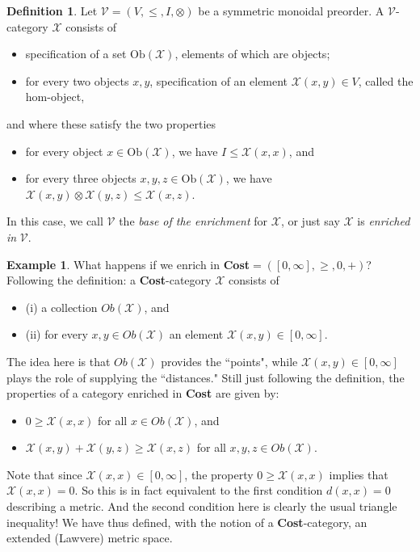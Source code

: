 \documentclass[11pt]{book}
\theoremstyle{definition}
\newtheorem{example}{Example}[section]
\theoremstyle{definition}
\newtheorem{definition}{Definition}[section]
\theoremstyle{definition}
\theoremstyle{theorem}
\theoremstyle{definition}
\begin{document}
\begin{definition}
	Let $\mathcal{V} = (V, \leq, I, \otimes)$ be a symmetric monoidal preorder. A $\mathcal{V}$-category  $\mathcal{X}$ consists of
	\begin{itemize}
		\item specification of a set $\text{Ob}(\mathcal{X})$, elements of which are objects; 
		\item for every two objects $x, y$, specification of an element $\mathcal{X}(x,y) \in V$, called the hom-object, 
	\end{itemize}
	and where these satisfy the two properties 
	\begin{itemize}
		\item for every object $x \in \text{Ob}(\mathcal{X})$, we have $I \leq \mathcal{X}(x,x)$, and 
		\item for every three objects $x, y,z \in \text{Ob}(\mathcal{X})$, we have $\mathcal{X}(x,y) \otimes \mathcal{X}(y,z) \leq \mathcal{X}(x,z)$. 
	\end{itemize}
	In this case, we call $\mathcal{V}$ the \textit{base of the enrichment} for $\mathcal{X}$, or just say $\mathcal{X}$ is \textit{enriched in} $\mathcal{V}$. 
\end{definition}
\begin{example} 
	What happens if we enrich in \textbf{Cost}$= ([0, \infty], \geq, 0, +)$? Following the definition: a \textbf{Cost}-category $\mathcal{X}$ consists of 
	\begin{itemize}
		\item (i) a collection $Ob(\mathcal{X})$, and 
		\item (ii) for every $x, y \in Ob(\mathcal{X})$ an element $\mathcal{X}(x,y) \in [0, \infty]$.
	\end{itemize}
	The idea here is that $Ob(\mathcal{X})$ provides the ``points", while $\mathcal{X}(x,y) \in [0, \infty]$ plays the role of supplying the ``distances." Still just following the definition, the properties of a category enriched in \textbf{Cost} are given by:  
	\begin{itemize}
		\item $0 \geq \mathcal{X}(x,x)$ for all $x \in Ob(\mathcal{X})$, and 
		\item $\mathcal{X}(x,y) + \mathcal{X}(y,z) \geq \mathcal{X}(x,z)$ for all $x,y,z \in Ob(\mathcal{X})$.  
	\end{itemize} 
	Note that since $\mathcal{X}(x,x) \in [0, \infty]$, the property $0 \geq \mathcal{X}(x,x)$ implies that $\mathcal{X}(x,x) = 0$. So this is in fact equivalent to the first condition $d(x,x) = 0$ describing a metric. And the second condition here is clearly the usual triangle inequality! We have thus defined, with the notion of a \textbf{Cost}-category, an extended (Lawvere) metric space.
\end{example} \noindent 
\end{document}
